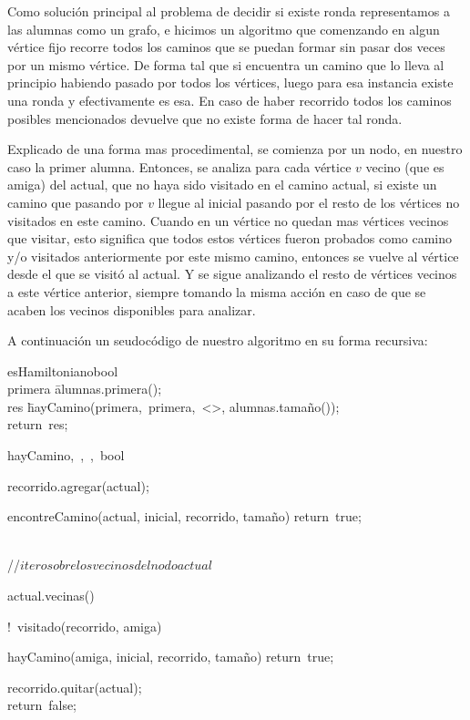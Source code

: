 Como solución principal al problema de decidir si existe ronda representamos a las alumnas como un grafo, e hicimos un algoritmo que comenzando en algun vértice fijo recorre todos los caminos que se puedan formar sin pasar dos veces por un mismo vértice. De forma tal que si encuentra un camino que lo lleva al principio habiendo pasado por todos los vértices, luego para esa instancia existe una ronda y efectivamente es esa. En caso de haber recorrido todos los caminos posibles mencionados devuelve que no existe forma de hacer tal ronda.

Explicado de una forma mas procedimental, se comienza por un nodo, en nuestro caso la primer alumna. Entonces, se analiza para cada vértice $v$ vecino (que es amiga) del actual, que no haya sido visitado en el camino actual, si existe un camino que pasando por $v$ llegue al inicial pasando por el resto de los vértices no visitados en este camino. Cuando en un vértice no quedan mas vértices vecinos que visitar, esto significa que todos estos vértices fueron probados como camino y/o visitados anteriormente por este mismo camino, entonces se vuelve al vértice desde el que se visitó al actual. Y se sigue analizando el resto de vértices vecinos a este vértice anterior, siempre tomando la misma acción en caso de que se acaben los vecinos disponibles para analizar.

\newpage
A continuación un seudocódigo de nuestro algoritmo en su forma recursiva:

\begin{algorithm}
{esHamiltoniano}{}{bool}
	 \\
	primera \= alumnas.primera();\\
	res \= hayCamino(primera,\ primera,\ <>, alumnas.tamaño());\\
	return\ res;
\end{algorithm}

\begin{algorithm}
{hayCamino}{,\ ,\ ,\ }{bool}
{	recorrido.agregar(actual);\\
	\begin{IF}{encontreCamino(actual, inicial, recorrido, tamaño)}
		return\ true;
	\end{IF}\\
	//$itero sobre los vecinos del nodo actual$\\
    \begin{FOREACH}{}{actual.vecinas()}{
        \begin{IF}{!\ visitado(recorrido, amiga) }
			\begin{IF}{hayCamino(amiga, inicial, recorrido, tamaño)}
			    return\ true;\\
			 \end{IF}
		\end{IF}}
    \end{FOREACH}
	\hspace{-3.4cm}recorrido.quitar(actual);\\
	return\ false;}
\end{algorithm}

